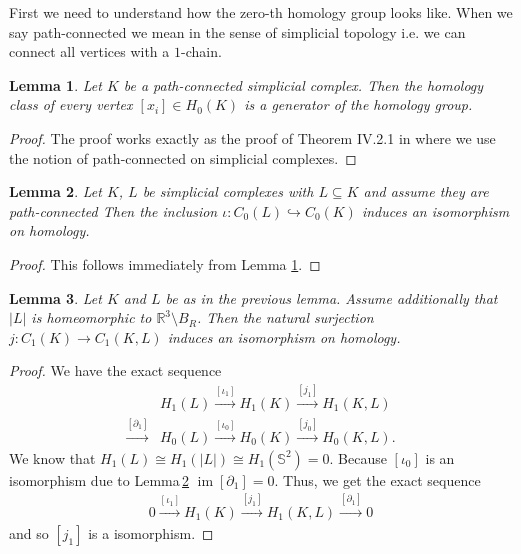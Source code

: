 \documentclass[12pt,a4paper]{article}
\numberwithin{equation}{subsection}
\newtheorem{lemma}{Lemma}[section]
\numberwithin{lemma}{subsection}
\theoremstyle{definition}
\DeclareMathOperator{\Ima}{im}
\newcommand{\real}{\mathbb{R}}
\begin{document}
First we need to understand how the zero-th homology group looks like. 
When we say path-connected we mean in the sense of simplicial topology i.e. 
we can connect all vertices with a $1$-chain.

\begin{lemma}\label{lem:zeroth_homology_group}
    Let $K$ be a path-connected simplicial complex. Then the homology class 
    of every vertex $[x_i] \in H_0(K)$ is a generator of the homology group.  
\end{lemma}
\begin{proof}
    The proof works exactly as the proof of Theorem IV.2.1 in 
    \cite{topology_and_geometry} where we use the notion of path-connected
    on simplicial complexes.
\end{proof}

\begin{lemma}\label{lem:inclusion_zeroth_homology}
    Let $K$, $L$ be simplicial complexes with $L \subseteq K$ and 
    assume they are path-connected  Then
    the inclusion $\iota: C_0(L) \hookrightarrow C_0(K)$ induces an isomorphism
    on homology.
\end{lemma}
\begin{proof}
    This follows immediately from Lemma \ref{lem:zeroth_homology_group}.
\end{proof}


\begin{lemma}\label{lem:isom_chains_and_relative_chains}
    Let $K$ and $L$ be as in the previous lemma. Assume additionally
    that $|L|$ is homeomorphic to $\real^3 \setminus B_R$.
    Then the natural surjection
    $j: C_1(K) \rightarrow C_1(K,L)$ induces an isomorphism on homology.
\end{lemma}
\begin{proof}
    We have the exact sequence 
    \begin{align*}
        &H_1(L) \xrightarrow{[\iota_1]} H_1(K) \xrightarrow{[j_1]} H_1(K,L) \\
        \xrightarrow{[\partial_1]} &H_0(L) \xrightarrow{[\iota_0]} H_0(K) 
            \xrightarrow{[j_0]} H_0(K,L).
    \end{align*}
    We know that $H_1(L) \cong H_1(|L|) \cong H_1(\mathbb{S}^2) = 0$. 
    Because $[\iota_0]$ is an isomorphism due to 
    Lemma\,\ref{lem:inclusion_zeroth_homology} $\Ima [\partial_1] = 0$. 
    Thus, we get the exact sequence 
    \begin{align*}
        0 \xrightarrow{[\iota_1]} H_1(K) \xrightarrow{[j_1]} H_1(K,L)
        \xrightarrow{[\partial_1]} 0
    \end{align*}
    and so $[j_1]$ is a isomorphism.
\end{proof}
\end{document}
